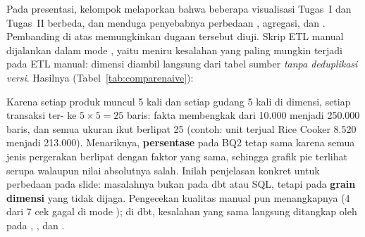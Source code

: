 \begin{table}[H]
\centering\small
\caption{Hasil : ETL manual yang benar vs dbt.}\label{tab:comparenormal}
\end{table}

 Pada presentasi, kelompok melaporkan bahwa beberapa visualisasi Tugas~I dan Tugas~II berbeda, dan menduga penyebabnya perbedaan , agregasi, dan . Pembanding di atas memungkinkan dugaan tersebut diuji. Skrip ETL manual dijalankan dalam mode , yaitu meniru kesalahan yang paling mungkin terjadi pada ETL manual: dimensi diambil langsung dari tabel sumber \emph{tanpa deduplikasi versi}. Hasilnya (Tabel~\ref{tab:comparenaive}):

\begin{table}[H]
\centering\small
\caption{Hasil pembanding bila ETL manual tidak melakukan deduplikasi ().}\label{tab:comparenaive}
\end{table}

Karena setiap produk muncul 5 kali dan setiap gudang 5 kali di dimensi, setiap transaksi ter- ke $5 \times 5 = 25$ baris: fakta membengkak dari 10.000 menjadi 250.000 baris, dan semua ukuran ikut berlipat 25 (contoh: unit terjual Rice Cooker 8.520 menjadi 213.000). Menariknya, \textbf{persentase} pada BQ2 tetap sama karena semua jenis pergerakan berlipat dengan faktor yang sama, sehingga grafik pie terlihat serupa walaupun nilai absolutnya salah. Inilah penjelasan konkret untuk perbedaan pada slide: masalahnya bukan pada dbt atau SQL, tetapi pada \textbf{grain dimensi} yang tidak dijaga. Pengecekan kualitas manual pun menangkapnya (4 dari 7 cek gagal di mode ); di dbt, kesalahan yang sama langsung ditangkap oleh  pada , , dan .

